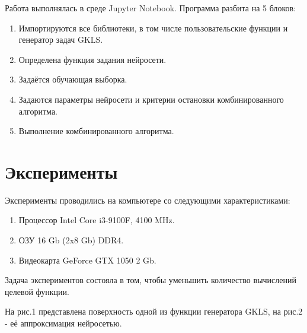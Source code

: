 \documentclass[11pt, oneside, a4paper]{article}
\begin{document}
Работа выполнялась в среде Jupyter Notebook. Программа разбита на 5 блоков:
\begin{enumerate}
\item Импортируются все библиотеки, в том числе пользовательские функции и генератор задач GKLS.
\item Определена функция задания нейросети.
\item Задаётся обучающая выборка.
\item Задаются параметры нейросети и критерии остановки комбинированного алгоритма.
\item Выполнение комбинированного алгоритма.
\end{enumerate}

\section{Эксперименты}
Эксперименты проводились на компьютере со следующими характеристиками:
\begin{enumerate}
\item Процессор Intel Core i3-9100F, 4100 MHz.
\item ОЗУ 16 Gb (2x8 Gb) DDR4.
\item Видеокарта GeForce GTX 1050 2 Gb.
\end{enumerate}


Задача экспериментов состояла в том, чтобы уменьшить количество вычислений целевой функции.

На рис.1 представлена поверхность одной из функции генератора GKLS, на рис.2 - её аппроксимация нейросетью.
\end{document}
